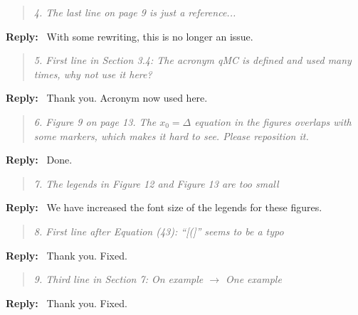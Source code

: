 \documentclass[11pt]{article}
\newenvironment{response}{%
  \vspace{1em}
  \begin{quote}\itshape
}{%
  \end{quote}
  \noindent\textbf{Reply:}~
}
\begin{document}
\begin{response}{4.}
    The last line on page 9 is just a reference...
\end{response}
With some rewriting, this is no longer an issue.

\begin{response}{5.}
    First line in Section 3.4: The acronym qMC is defined and used many times, why not use it here?
\end{response}
    Thank you. Acronym now used here.


\begin{response}{6.}
    Figure 9 on page 13. The $x_0 = \Delta$ equation in the figures overlaps with some markers, which makes it hard to see. Please reposition it.
\end{response}
Done.



\begin{response}{7.}
    The legends in Figure 12 and Figure 13 are too small
\end{response}
We have increased the font size of the legends for these figures. 


\begin{response}{8.}
    First line after Equation (43): “[(]” seems to be a typo
\end{response}
Thank you. Fixed.


\begin{response}{9.}
    Third line in Section 7: On example $\rightarrow$ One example
\end{response}
Thank you. Fixed.
\end{document}
